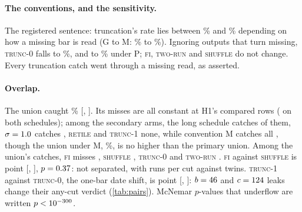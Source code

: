 \documentclass[11pt]{article}
\newcommand{\FI}{\textsc{fi}}
\newcommand{\TZ}{\textsc{trunc-0}}
\newcommand{\TO}{\textsc{trunc-1}}
\newcommand{\RT}{\textsc{retile}}
\newcommand{\TR}{\textsc{two-run}}
\newcommand{\SH}{\textsc{shuffle}}
\newcommand{\pct}{\%}
\begin{document}
\paragraph{The conventions, and the sensitivity.} The registered sentence: truncation's rate lies
between \NumCConvX\pct{} and \NumCConvY\pct{} depending on how a missing bar is read (G to M:
\NumCConvG\pct{} to \NumCConvM\pct). Ignoring outputs that turn missing, \TZ{} falls to
\NumCIgnTzG\pct, and to \NumCIgnTzP\pct{} under P; \FI, \TR{} and \SH{} do not change. Every
truncation catch went through a missing read, as asserted.

\paragraph{Overlap.} The union caught \NumCUnion\pct{} [\NumCUnionLo, \NumCUnionHi]. Its
\NumCUMiss{} misses are all constant at H1's compared rows (\NumCUMissConstBoth{} on both
schedules); among the secondary arms, the long schedule catches \NumCUMissByLong{} of them,
$\sigma=1.0$ catches \NumCUMissBySigOne, \RT{} \NumCUMissByRt{} and \TO{} none, while
convention M catches all \NumCUMissByM, though the union under M, \NumCUnionM\pct, is no higher than
the primary union. Among the union's \NumCUnionCount{} catches, \FI{} misses
\NumCMissedFi, \SH{} \NumCMissedSh, \TZ{} \NumCMissedTz{} and \TR{} \NumCMissedTr. \FI{} against
\SH{} is \NumCPairFiShDiff{} point [\NumCPairFiShLo, \NumCPairFiShHi], $p = 0.37$: not
separated, with \NumRunsFI{} runs per cut against \NumRunsShuffle{} twins. \TO{} against \TZ, the
one-bar date shift, is \NumCPairToTzDiff{} point [\NumCPairToTzLo, \NumCPairToTzHi]: $b =
46$ and $c = 124$ leaks change their any-cut verdict (\cref{tab:pairs}).
McNemar $p$-values that underflow are written $p < 10^{-300}$.
\end{document}

